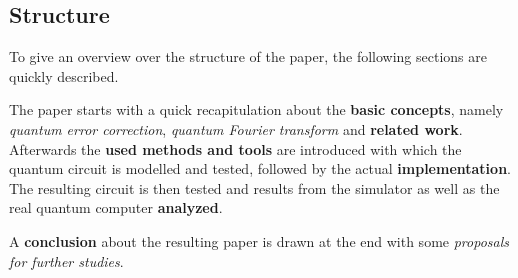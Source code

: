 \subsection{Structure}
\label{subsec:structure}

To give an overview over the structure of the paper, the following sections are quickly described.

The paper starts with a quick recapitulation about the \textbf{basic concepts}, namely \emph{quantum error correction}, \emph{quantum Fourier transform} and \textbf{related work}.
Afterwards the \textbf{used methods and tools} are introduced with which the quantum circuit is modelled and tested, followed by the actual \textbf{implementation}.
The resulting circuit is then tested and results from the simulator as well as the real quantum computer \textbf{analyzed}.

A \textbf{conclusion} about the resulting paper is drawn at the end with some \emph{proposals for further studies}.

